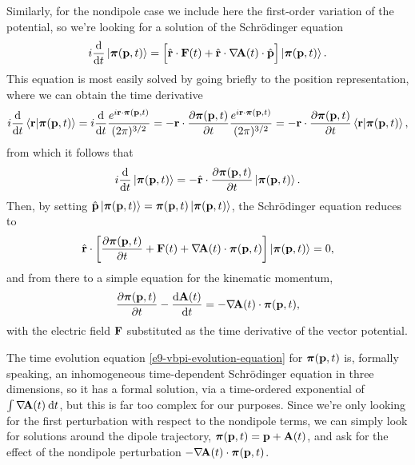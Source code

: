 Similarly, for the nondipole case we include here the first-order variation of the potential, so we're looking for a solution of the Schrödinger equation
\begin{equation}
i\frac{\mathrm{d}}{\mathrm{d} t}\ket{\boldsymbol{\pi}(\vb{p},t)} 
= 
\left[\vphantom{\sum} \hat {\vb{r}}\cdot\vb{F}(t) + \hat{\vb{r}}\cdot\nabla\!\vb{A}(t)\cdot\hat{\vb{p}} \right]
\ket{\boldsymbol{\pi}(\vb{p},t)}.
\end{equation}
This equation is most easily solved by going briefly to the position representation, where we can obtain the time derivative
\begin{equation}
i\frac{\mathrm{d}}{\mathrm{d} t} \braket{\vb{r}}{\boldsymbol{\pi}(\vb{p},t)} 
=
i\frac{\mathrm{d}}{\mathrm{d} t} \frac{e^{i\vb{r} \cdot \boldsymbol{\pi}(\vb{p},t)}}{(2\pi)^{3/2}}
=
-\vb{r} \cdot \frac{\partial\boldsymbol{\pi}(\vb{p},t)}{\partial t}\frac{e^{i\vb{r} \cdot \boldsymbol{\pi}(\vb{p},t)}}{(2\pi)^{3/2}}
=
-\vb{r} \cdot \frac{\partial\boldsymbol{\pi}(\vb{p},t)}{\partial t} \braket{\vb{r}}{\boldsymbol{\pi}(\vb{p},t)}
,
\end{equation}
from which it follows that
\begin{equation}
i\frac{\mathrm{d}}{\mathrm{d} t} \ket{\boldsymbol{\pi}(\vb{p},t)} 
=
-\hat {\vb{r}} \cdot \frac{\partial\boldsymbol{\pi}(\vb{p},t)}{\partial t} \ket{\boldsymbol{\pi}(\vb{p},t)}
.
\end{equation}
Then, by setting $\hat{\vb{p}} \ket{\boldsymbol{\pi}(\vb{p},t)} = \boldsymbol{\pi}(\vb{p},t) \ket{\boldsymbol{\pi}(\vb{p},t)}$, the Schrödinger equation reduces to 
\begin{equation}
\hat {\vb{r}}\cdot \left[
 \vphantom{\sum} 
 \frac{\partial\boldsymbol{\pi}(\vb{p},t)}{\partial t}
 + \vb{F}(t) 
 + \nabla\!\vb{A}(t)\cdot \boldsymbol{\pi}(\vb{p},t)
\right]
\ket{\boldsymbol{\pi}(\vb{p},t)}
=0
,
\end{equation}
and from there to a simple equation for the kinematic momentum,
\begin{equation}
\frac{\partial\boldsymbol{\pi}(\vb{p},t)}{\partial t}
- \frac{\mathrm{d} \vb{A}(t)}{\mathrm{d} t}
=
-\nabla\!\vb{A}(t)\cdot \boldsymbol{\pi}(\vb{p},t)
,
\label{e9-vbpi-evolution-equation}
\end{equation}
with the electric field $\vb{F}$ substituted as the time derivative of the vector potential.


The time evolution equation \eqref{e9-vbpi-evolution-equation} for $\boldsymbol{\pi}(\vb{p},t)$ is, formally speaking, an inhomogeneous time-dependent Schrödinger equation in three dimensions,  so it has a formal solution, via a time-ordered exponential of $\int \nabla\!\vb{A}(t)\:\mathrm{d} t$, but this is far too complex for our purposes. Since we're only looking for the first perturbation with respect to the nondipole terms, we can simply look for solutions around the dipole trajectory, $\boldsymbol{\pi}( \vb{p},t) =\vb{p}+\vb{A}(t)$, and ask for the effect of the nondipole perturbation $-\nabla\!\vb{A}(t)\cdot \boldsymbol{\pi}(\vb{p},t)$.


